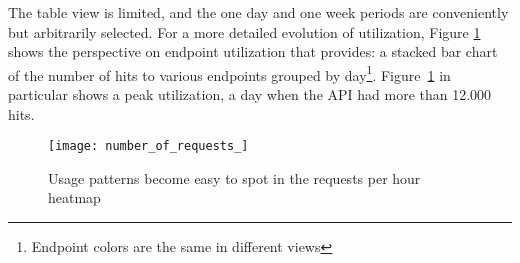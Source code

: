 




The table view is limited, and the one day and one week periods are conveniently but arbitrarily selected. For a more detailed evolution of utilization, Figure \ref{fig:aeu} shows the  perspective on endpoint utilization that \tool provides: a stacked bar chart of the number of hits to various endpoints grouped by day\footnote{Endpoint colors are the same in different views}. Figure~\ref{fig:aeu} in particular shows a peak utilization, a day when the API had more than 12.000 hits. 

\begin{figure}[!ht]
\centering
\texttt{[image: number\_of\_requests\_]}
\caption{Usage patterns become easy to spot in the requests per hour heatmap}
\label{fig:aeu}
\end{figure}








